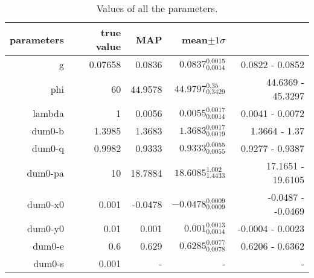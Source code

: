 \begin{table*}\caption{Values of all the parameters.}\begin{center}\begin{tabular}{ r r r r r} parameters & true value & MAP & mean$\pm 1 \sigma$ \\ 
\hline  g & 0.07658 & 0.0836 & $0.0837_{0.0014}^{0.0015}$ & 0.0822 - 0.0852 \\ 
 phi & 60 & 44.9578 & $44.9797_{0.3429}^{0.35}$ & 44.6369 - 45.3297 \\ 
\hline lambda & 1 & 0.0056 & $0.0055_{0.0014}^{0.0017}$ & 0.0041 - 0.0072 \\ 
\hline dum0-b & 1.3985 & 1.3683 & $1.3683_{0.0019}^{0.0017}$ & 1.3664 - 1.37 \\ 
 dum0-q & 0.9982 & 0.9333 & $0.9333_{0.0055}^{0.0055}$ & 0.9277 - 0.9387 \\ 
 dum0-pa & 10 & 18.7884 & $18.6085_{1.4433}^{1.002}$ & 17.1651 - 19.6105 \\ 
 dum0-x0 & 0.001 & -0.0478 & $-0.0478_{0.0009}^{0.0009}$ & -0.0487 - -0.0469 \\ 
 dum0-y0 & 0.01 & 0.001 & $0.001_{0.0014}^{0.0013}$ & -0.0004 - 0.0023 \\ 
 dum0-e & 0.6 & 0.629 & $0.6285_{0.0078}^{0.0077}$ & 0.6206 - 0.6362 \\ 
 dum0-s & 0.001 & - & - & - \\ 
\hline\end{tabular}\end{center}\label{tab:1}\end{table*}